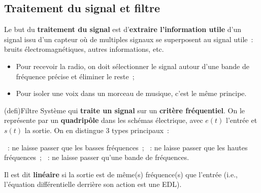 \documentclass[../../main/main.tex]{subfiles}
\begin{document}
\subsection{Traitement du signal et filtre}
Le but du \textbf{traitement du signal} est d'\textbf{extraire l'information utile} d'un signal
issu d'un capteur où de multiples signaux se superposent au signal utile~:
bruits électromagnétiques, autres informations, etc.
\begin{itemize}
	\item Pour recevoir la radio, on doit sélectionner le signal autour d'une
	      bande de fréquence précise et éliminer le reste~;
	\item Pour isoler une voix dans un morceau de musique, c'est le même principe.
\end{itemize}

\begin{tcb*}[sidebyside, righthand ratio=.3](defi){Filtre}
	Système qui \textbf{traite un signal} sur un \textbf{critère fréquentiel}. On
	le représente par un \textbf{quadripôle} dans les schémas électrique, avec
	$e(t)$ l'entrée et $s(t)$ la sortie. On en distingue 3 types principaux~:
	\begin{itemize}
		~: ne laisse passer que les basses fréquences~;
		~: ne laisse passer que les hautes fréquences~;
		~: ne laisse passer qu'une bande de fréquences.
	\end{itemize}
	Il est dit \textbf{linéaire} si la sortie est de même(s) fréquence(s) que
	l'entrée (i.e., l'équation différentielle derrière son action est une EDL).
	\tcblower
	\begin{center}
	\end{center}
\end{tcb*}
\end{document}
